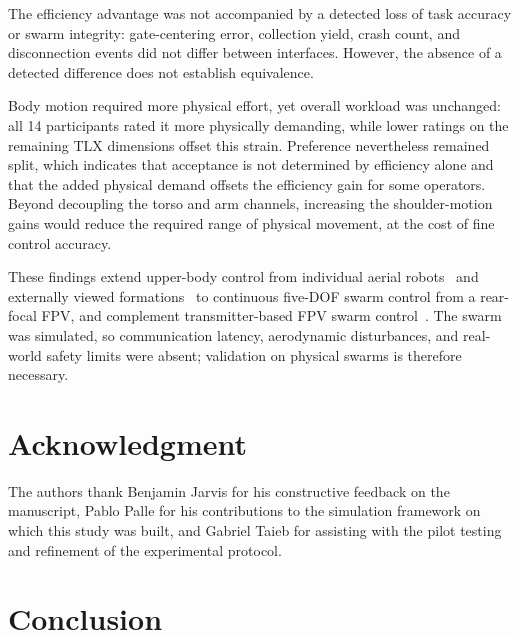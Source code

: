 \documentclass[a4paper,10pt,conference]{ieeeconf}
\begin{document}
The efficiency advantage was not accompanied by a detected loss of task accuracy
or swarm integrity: gate-centering error, collection yield, crash count, and
disconnection events did not differ between interfaces. However, the absence of
a detected difference does not establish equivalence.

Body motion required more physical effort, yet overall workload was unchanged:
all 14 participants rated it more physically demanding, while lower ratings on
the remaining TLX dimensions offset this strain. Preference nevertheless
remained split, which indicates that acceptance is not determined by efficiency
alone and that the added physical demand offsets the efficiency gain for some
operators. Beyond decoupling the torso and arm channels, increasing the
shoulder-motion gains would reduce the required range of physical movement, at
the cost of fine control accuracy.

These findings extend upper-body control from individual aerial
robots~\cite{rognon2018flyjacket,miehlbradt2018datadriven,macchini2024datadriven}
and externally viewed
formations~\cite{macchini2021personalized,tsykunov2019swarmtouch,kratky2025gesture}
to continuous five-DOF swarm control from a rear-focal FPV, and complement
transmitter-based FPV swarm control~\cite{ben_focaldrone}. The swarm was
simulated, so communication latency, aerodynamic disturbances, and real-world
safety limits were absent; validation on physical swarms is therefore necessary.
\section*{Acknowledgment}
The authors thank Benjamin Jarvis for his constructive feedback on the
manuscript, Pablo Palle for his contributions to the simulation framework on
which this study was built, and Gabriel Taieb for assisting with the pilot
testing and refinement of the experimental protocol.

\section{Conclusion}


\end{document}
